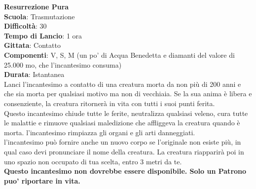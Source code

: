 \begin{multicols}{2}
\medskip\textbf{Resurrezione Pura}\\
\textbf{Scuola}: Trasmutazione\\
\textbf{Difficoltà}:  30\\
\textbf{Tempo di Lancio}: 1 ora\\
\textbf{Gittata}: Contatto\\
\textbf{Componenti}: V, S, M (un po’ di Acqua Benedetta e diamanti del valore di 25.000 mo, che l'incantesimo consuma)\\
\textbf{Durata}: Istantanea\\
Lanci l'incantesimo a contatto di una creatura morta da non più di 200 anni e che sia morta per qualsiasi motivo ma non di vecchiaia. Se la sua anima è libera e consenziente, la creatura ritornerà in vita con tutti i suoi punti ferita. \\
Questo incantesimo chiude tutte le ferite, neutralizza qualsiasi veleno, cura tutte le malattie e rimuove qualsiasi maledizione che affliggeva la creatura quando è morta. l'incantesimo rimpiazza gli organi e gli arti danneggiati.\\
l'incantesimo può fornire anche un nuovo corpo se l’originale non esiste più, in qual caso devi pronunciare il nome della creatura. La creatura riapparirà poi in uno spazio non occupato di tua scelta, entro 3 metri da te. \\
\textbf{Questo incantesimo non dovrebbe essere disponibile. Solo un Patrono puo' riportare in vita.}


\end{multicols}
